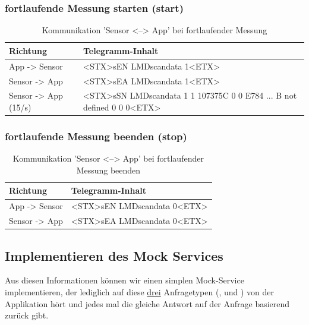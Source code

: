 \subsubsection{fortlaufende Messung starten (start)}
\begin{table}[H]
	\centering
	\begin{tabular}{lp{13cm}} \toprule
		\textbf{Richtung} 	& \textbf{Telegramm-Inhalt}							\\ \midrule
		App -> Sensor		& <STX>sEN LMDscandata 1<ETX> 							\\ \midrule
		Sensor -> App		& <STX>sEA LMDscandata 1<ETX>							\\ \midrule
		Sensor -> App (15/s)	& <STX>sSN LMDscandata 1 1 107375C 0 0 E784 ... B not defined 0 0 0<ETX>	\\ \bottomrule
	\end{tabular}
	\caption{Kommunikation 'Sensor <--> App' bei fortlaufender Messung}
	\label{tab:fortlaufendeMessungStart}
\end{table}

\subsubsection{fortlaufende Messung beenden (stop)}
\begin{table}[H]
	\centering
	\begin{tabular}{lp{13cm}} \toprule
		\textbf{Richtung} 	& \textbf{Telegramm-Inhalt}							\\ \midrule
		App -> Sensor		& <STX>sEN LMDscandata 0<ETX> 							\\ \midrule
		Sensor -> App		& <STX>sEA LMDscandata 0<ETX>							\\ \bottomrule
	\end{tabular}
	\caption{Kommunikation 'Sensor <--> App' bei fortlaufender Messung beenden}
	\label{tab:fortlaufendeMessungStop}
\end{table}

\subsection{Implementieren des Mock Services}
Aus diesen Informationen können wir einen simplen Mock-Service implementieren, der lediglich auf diese \underline{drei} Anfragetypen (,  und ) von der Applikation hört und jedes mal die gleiche Antwort auf der Anfrage basierend zurück gibt.

